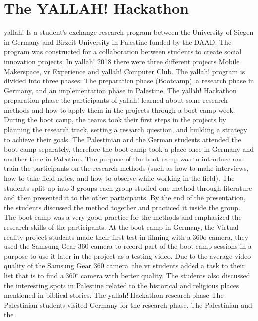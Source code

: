\section{The YALLAH! Hackathon}

\acrshort{yallah!} Is a student’s exchange research program between the University of Siegen in
Germany and Birzeit University in Palestine funded by the DAAD. The program was
constructed for a collaboration between students to create social innovation projects.
In \acrshort{yallah!} 2018 there were three different projects Mobile Makerspace, \acrshort{vr} Experience and
\acrshort{yallah!} Computer Club. The \acrshort{yallah!} program is divided into three phases: The preparation
phase (Bootcamp), a research phase in Germany, and an implementation phase in Palestine.
The \acrshort{yallah!} Hackathon preparation phase
the participants of \acrshort{yallah!} learned about some research methods and how to apply them in
the projects through a boot camp week. During the boot camp, the teams took their first
steps in the projects by planning the research track, setting a research question, and building
a strategy to achieve their goals.
The Palestinian and the German students attended the boot camp separately, therefore the
boot camp took a place once in Germany and another time in Palestine. The purpose of the
boot camp was to introduce and train the participants on the research methods (such as how
to make interviews, how to take field notes, and how to observe while working in the field).
The students split up into 3 groups each group studied one method through literature and
then presented it to the other participants. By the end of the presentation, the students
discussed the method together and practiced it inside the group. The boot camp was a very
good practice for the methods and emphasized the research skills of the participants. At the
boot camp in Germany, the Virtual reality project students made their first test in filming with
a 360o camera, they used the Samsung Gear 360 camera to record part of the boot camp
sessions in a purpose to use it later in the project as a testing video. Due to the average video
quality of the Samsung Gear 360 camera, the \acrshort{vr} students added a task to their list that is to
find a 360$^{\circ}$ camera with better quality. The students also discussed the interesting spots in
Palestine related to the historical and religious places mentioned in biblical stories.
The \acrshort{yallah!} Hackathon research phase
The Palestinian students visited Germany for the research phase. The Palestinian and the
